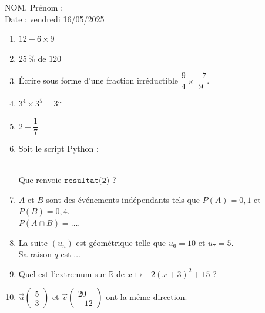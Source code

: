 \documentclass[a4paper,11pt,landscape,exos]{nsi} %
\begin{document}
\begin{multicols}{2}
    \textcolor{UGLiBlue}{NOM, Prénom :\\
    Date : vendredi 16/05/2025}\\
\maketitle

\begin{enumerate}[itemsep=1em]
    \item  $12-6\times9$
	\item $25\,\%$ de $120$
	\item Écrire sous forme d'une fraction irréductible $\dfrac{9}{4}\times \dfrac{-7}{9}$.
	\item $3^{4}\times 3^{5}=3^{\ldots}$
	\item $2-\dfrac{1}{7}$ 
	\item Soit le script Python : 

\medskip
\medskip\hspace*{10mm}\newline\medskip\\Que renvoie  $\texttt{resultat(2)}$ ?
	\item $A$ et $B$ sont des événements indépendants tels que $P(A)=0{,}1$ et $P(B)=0{,}4$.
\\ $P(A\cap B)=\ldots$.
	\item La suite $(u_n)$ est géométrique telle que  $u_{6}= 10$ et $u_{7}= 5$.\\Sa raison $q$ est $\ldots$
	\item Quel est l'extremum sur $\mathbb{R}$ de  $x\longmapsto -2(x+3)^2+15$ ?  
	\item $\vec{u}\begin{pmatrix}5 \\3\end{pmatrix}$ et $\vec{v}\begin{pmatrix}20 \\ -12\end{pmatrix}$ ont la même direction. \\ 
    

\end{enumerate}
\end{multicols}
\end{document}
